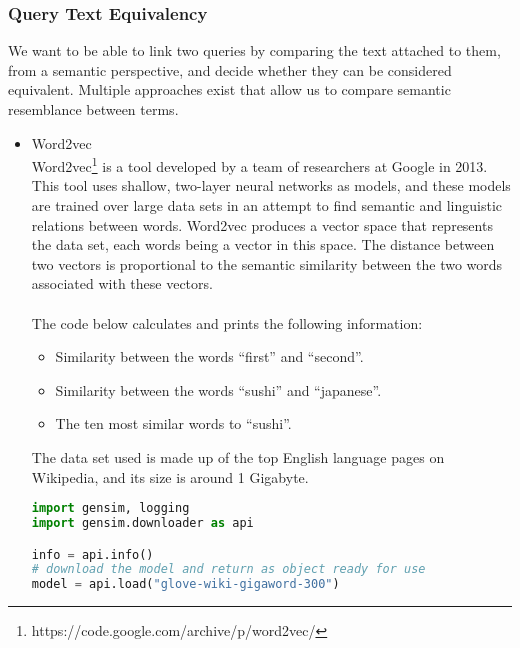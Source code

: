 \subsubsection{Query Text Equivalency}
We want to be able to link two queries by comparing the text attached to them, from a semantic perspective, and decide whether they can be considered equivalent. Multiple approaches exist that allow us to compare semantic resemblance between terms.
\begin{itemize}
\item Word2vec\\
Word2vec\footnote{https://code.google.com/archive/p/word2vec/} is a tool developed by a team of researchers at Google in 2013. This tool uses shallow, two-layer neural networks as models, and these models are trained over large data sets in an attempt to find semantic and linguistic relations between words. Word2vec produces a vector space that represents the data set, each words being a vector in this space. The distance between two vectors is proportional to the semantic similarity between the two words associated with these vectors.\\\\
The code below calculates and prints the following information:
\begin{itemize}
\item Similarity between the words ``first'' and ``second''.
\item Similarity between the words ``sushi'' and ``japanese''.
\item The ten most similar words to ``sushi''.
\end{itemize}
The data set used is made up of the top English language pages on Wikipedia, and its size is around 1 Gigabyte.\\
\begin{lstlisting}[language=Python]
import gensim, logging
import gensim.downloader as api

info = api.info()
# download the model and return as object ready for use
model = api.load("glove-wiki-gigaword-300")  


\end{lstlisting}
\end{itemize}
